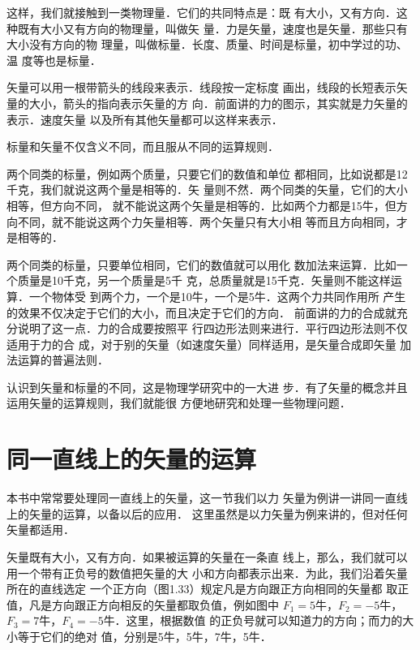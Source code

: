     这样，我们就接触到一类物理量．它们的共同特点是：既
有大小，又有方向．这种既有大小又有方向的物理量，叫做\textsf{矢
量}．力是矢量，速度也是矢量．那些只有大小没有方向的物
理量，叫做\textsf{标量}．长度、质量、时间是标量，初中学过的功、温
度等也是标量．

    矢量可以用一根带箭头的线段来表示．线段按一定标度
画出，线段的长短表示矢量的大小，箭头的指向表示矢量的方
向．前面讲的力的图示，其实就是力矢量的表示．速度矢量
以及所有其他矢量都可以这样来表示．

    标量和矢量不仅含义不同，而且服从不同的运算规则．

    两个同类的标量，例如两个质量，只要它们的数值和单位
都相同，比如说都是12千克，我们就说这两个量是相等的．矢
量则不然．两个同类的矢量，它们的大小相等，但方向不同，
就不能说这两个矢量是相等的．比如两个力都是15牛，但方
向不同，就不能说这两个力矢量相等．两个矢量只有大小相
等而且方向相同，才是相等的．

    两个同类的标量，只要单位相同，它们的数值就可以用化
数加法来运算．比如一个质量是10千克，另一个质量是5千
克，总质量就是15千克．矢量则不能这样运算．一个物体受
到两个力，一个是10牛，一个是5牛．这两个力共同作用所
产生的效果不仅决定于它们的大小，而且决定于它们的方向．
前面讲的力的合成就充分说明了这一点．力的合成要按照平
行四边形法则来进行．平行四边形法则不仅适用于力的合
成，对于别的矢量（如速度矢量）同样适用，是矢量合成即矢量
加法运算的普遍法则．

    认识到矢量和标量的不同，这是物理学研究中的一大进
步．有了矢量的概念并且运用矢量的运算规则，我们就能很
方便地研究和处理一些物理问题．

\section{同一直线上的矢量的运算}
    本书中常常要处理同一直线上的矢量，这一节我们以力
矢量为例讲一讲同一直线上的矢量的运算，以备以后的应用．
这里虽然是以力矢量为例来讲的，但对任何矢量都适用．

    矢量既有大小，又有方向．如果被运算的矢量在一条直
线上，那么，我们就可以用一个带有正负号的数值把矢量的大
小和方向都表示出来．为此，我们沿着矢量所在的直线选定
一个正方向（图1.33）规定凡是方向跟正方向相同的矢量都
取正值，凡是方向跟正方向相反的矢量都取负值，例如图中
$F_1=5$牛，$F_2=-5$牛，$F_3=7$牛，$F_4=-5$牛．这里，根据数值
的正负号就可以知道力的方向；而力的大小等于它们的绝对
值，分别是5牛，5牛，7牛，5牛．

